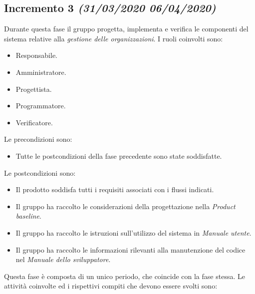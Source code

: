 \documentclass[../piano-di-progetto.tex]{subfiles}
\begin{document}
\subsection[Incremento 3]{Incremento 3 {\normalsize\normalfont\itshape(31/03/2020  06/04/2020)}}%
\label{sub:incremento_3}
Durante questa fase il gruppo progetta, implementa e verifica le componenti del sistema relative alla \textit{gestione delle organizzazioni}.
I ruoli coinvolti sono:
\begin{itemize}
  \item Responsabile.
  \item Amministratore.
  \item Progettista.
  \item Programmatore.
  \item Verificatore.
\end{itemize}
Le precondizioni sono:
\begin{itemize}
  \item Tutte le postcondizioni della fase precedente sono state soddisfatte.
\end{itemize}
Le postcondizioni sono:
\begin{itemize}
  \item Il prodotto soddisfa tutti i requisiti associati con i flussi indicati.
  \item Il gruppo ha raccolto le considerazioni della progettazione nella \textit{Product baseline}.
  \item Il gruppo ha raccolto le istruzioni sull'utilizzo del sistema in \textit{Manuale utente}.
  \item Il gruppo ha raccolto le informazioni rilevanti alla manutenzione del codice nel \textit{Manuale dello sviluppatore}.
\end{itemize}
Questa fase è composta di un unico periodo, che coincide con la fase stessa.
Le attività coinvolte ed i rispettivi compiti che devono essere svolti sono:
\end{document}
